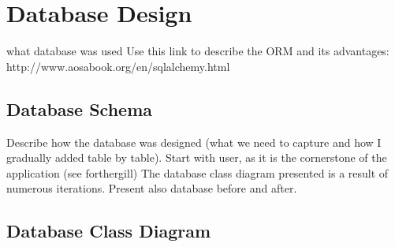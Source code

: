 \section{Database Design}
\label{databasedesign}
what database was used
Use this link to describe the ORM and its advantages: 
http://www.aosabook.org/en/sqlalchemy.html

\subsection{Database Schema}
Describe how the database was designed (what we need to capture and how I gradually added table by table). Start with user, as it is the cornerstone of the application (see forthergill)
The database class diagram presented is a result of numerous iterations.  
Present also database before and after.

\subsection{Database Class Diagram}

